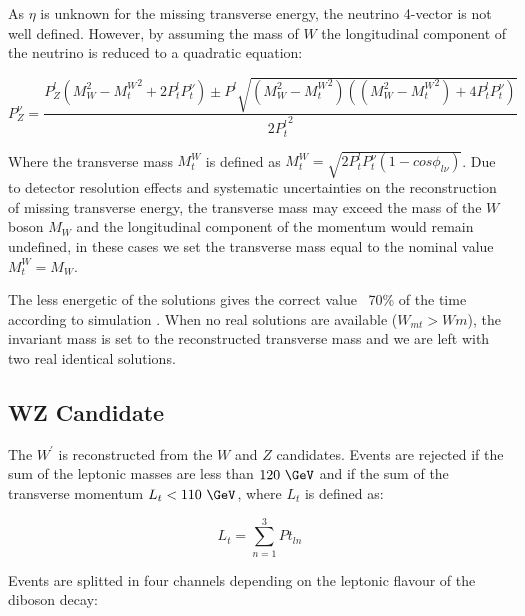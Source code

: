 As $\eta$ is unknown for the missing transverse energy, the neutrino 4-vector is
not well defined. However, by assuming the mass of $W$ the longitudinal component
of the neutrino is reduced to a quadratic equation:

\[
P_{Z}^{\nu} = \frac{P_{Z}^{l}({M_{W}^{2}-{M_{t}^{W}}^2+2P_{t}^{l}{P_{t}^{\nu}}}) \pm P^{l}\sqrt{(M_{W}^{2}-{M_{t}^{W}}^2)((M_{W}^{2}-{M_{t}^{W}}^2)+4P_{t}^{l}P_{t}^{\nu})}}{{2P_{t}^{l}}^{2}}
\]

Where the transverse mass $M_{t}^{W}$ is defined
as ${M_{t}^{W}}=\sqrt{2P_{t}^{l}P_{t}^{\nu}(1-cos\phi_{l\nu})}$.
Due to detector resolution effects and systematic uncertainties on the
reconstruction of missing transverse energy, the transverse mass may
exceed the mass of the $W$ boson $M_W$ and the
longitudinal component of the momentum would remain undefined, in these cases
we set the transverse mass equal to the nominal value $M_{t}^{W}=M_W$.

The less energetic of the solutions gives the correct value ~70\% of the time
according to simulation \cite{wprime8TeV}.
When no real solutions are available ($W_{mt} > Wm$), the invariant
mass is set to the reconstructed transverse mass and we are left with two real
identical solutions.

\subsection{WZ Candidate}

The $W^{\prime}$ is reconstructed from the $W$ and $Z$ candidates.
Events are rejected if the sum of the leptonic masses are less than $120~\GeV$ and
if the sum of the transverse momentum $L_{t}<110~\GeV$, where $L_{t}$ is defined
as:

\[
L_{t} = \sum_{n=1}^{3} Pt_{ln}
\]

Events are splitted in four channels depending on the leptonic flavour of the
diboson decay:

